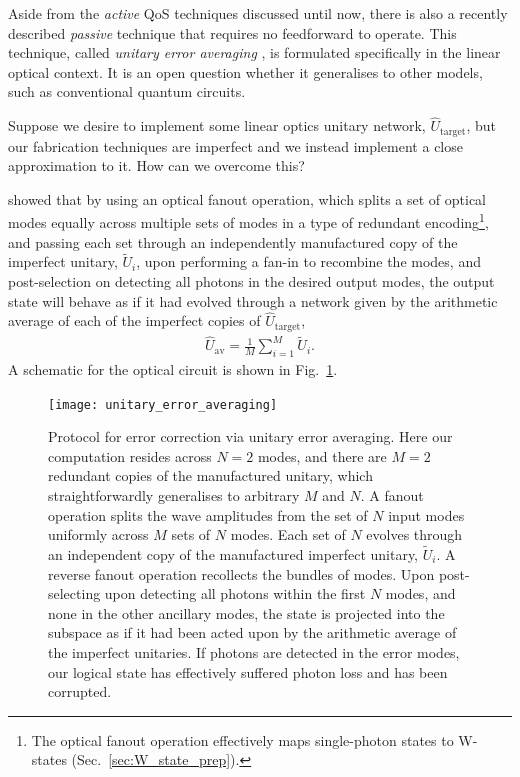 Aside from the \textit{active} QoS techniques discussed until now, there is also a recently described \textit{passive} technique that requires no feedforward to operate. This technique, called \textit{unitary error averaging} \cite{bib:MarshmanLundRohde}, is formulated specifically in the linear optical context. It is an open question whether it generalises to other models, such as conventional quantum circuits.

Suppose we desire to implement some linear optics unitary network, $\hat{U}_\mathrm{target}$, but our fabrication techniques are imperfect and we instead implement a close approximation to it. How can we overcome this?

\cite{bib:MarshmanLundRohdeRalph} showed that by using an optical fanout operation, which splits a set of optical modes equally across multiple sets of modes in a type of redundant encoding\footnote{The optical fanout operation effectively maps single-photon states to W-states (Sec.~\ref{sec:W_state_prep}).}, and passing each set through an independently manufactured copy of the imperfect unitary, $\tilde{U}_i$, upon performing a fan-in to recombine the modes, and post-selection on detecting all photons in the desired output modes, the output state will behave as if it had evolved through a network given by the arithmetic average of each of the imperfect copies of $\hat{U}_\mathrm{target}$,
\begin{align}
\hat{U}_\mathrm{av} = \frac{1}{M}\sum_{i=1}^M \tilde{U}_i.	
\end{align}
A schematic for the optical circuit is shown in Fig.~\ref{fig:error_av_circuit}.

\begin{figure}[!htbp]
\texttt{[image: unitary\_error\_averaging]}
\captionspacefig \caption{Protocol for error correction via unitary error averaging. Here our computation resides across \mbox{$N=2$} modes, and there are \mbox{$M=2$} redundant copies of the manufactured unitary, which straightforwardly generalises to arbitrary $M$ and $N$. A fanout operation splits the wave amplitudes from the set of $N$ input modes uniformly across $M$ sets of $N$ modes. Each set of $N$ evolves through an independent copy of the manufactured imperfect unitary, $\tilde{U}_i$. A reverse fanout operation recollects the bundles of modes. Upon post-selecting upon detecting all photons within the first $N$ modes, and none in the other ancillary modes, the state is projected into the subspace as if it had been acted upon by the arithmetic average of the imperfect unitaries. If photons are detected in the error modes, our logical state has effectively suffered photon loss and has been corrupted.} \label{fig:error_av_circuit}	
\end{figure}

